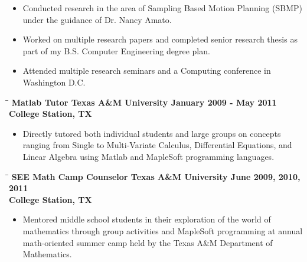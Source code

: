 \documentclass[8pt]{res}
\begin{document}
\begin{resume}
\begin{itemize}
      \item Conducted research in the area of Sampling Based Motion Planning (SBMP) under the guidance of Dr. Nancy Amato.
      \item Worked on multiple research papers and completed senior research thesis as part of my B.S. Computer Engineering degree plan.
      \item Attended multiple research seminars and a Computing conference in Washington D.C.
    \end{itemize}\vspace{-18pt}      %
    \pagebreak %
    \begin{tabbing}
      \hspace{2.3in}\= \hspace{2.6in}\= \kill %
      \bf Matlab Tutor \>\bf Texas A\&M University \>\bf January 2009 - May 2011\\ \>\bf College Station, TX
    \end{tabbing}\vspace{-10pt}      %
    \begin{itemize}
      \item Directly tutored both individual students and large groups on concepts ranging from Single to Multi-Variate Calculus, Differential Equations, and Linear Algebra using Matlab and MapleSoft programming languages.
    \end{itemize}\vspace{-18pt}      %
    \begin{tabbing}
      \hspace{2.3in}\= \hspace{2.6in}\= \kill %
      \bf SEE Math Camp Counselor \>\bf Texas A\&M University \>\bf June 2009, 2010, 2011\\ \>\bf College Station, TX
    \end{tabbing}\vspace{-10pt}      %
    \begin{itemize}
      \item Mentored middle school students in their exploration of the world of mathematics through group activities and MapleSoft programming at annual math-oriented summer camp held by the Texas A\&M Department of Mathematics.
    \end{itemize}


\end{resume}
\end{document}
